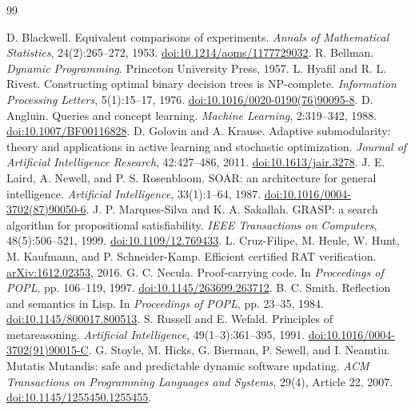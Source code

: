\begin{thebibliography}{99}
\small\raggedright
{} D. Blackwell. Equivalent comparisons of experiments. \emph{Annals of Mathematical Statistics}, 24(2):265--272, 1953. \href{https://doi.org/10.1214/aoms/1177729032}{doi:10.1214/aoms/1177729032}.
 R. Bellman. \emph{Dynamic Programming}. Princeton University Press, 1957.
 L. Hyafil and R. L. Rivest. Constructing optimal binary decision trees is NP-complete. \emph{Information Processing Letters}, 5(1):15--17, 1976. \href{https://doi.org/10.1016/0020-0190(76)90095-8}{doi:10.1016/0020-0190(76)90095-8}.
 D. Angluin. Queries and concept learning. \emph{Machine Learning}, 2:319--342, 1988. \href{https://doi.org/10.1007/BF00116828}{doi:10.1007/BF00116828}.
 D. Golovin and A. Krause. Adaptive submodularity: theory and applications in active learning and stochastic optimization. \emph{Journal of Artificial Intelligence Research}, 42:427--486, 2011. \href{https://doi.org/10.1613/jair.3278}{doi:10.1613/jair.3278}.
 J. E. Laird, A. Newell, and P. S. Rosenbloom. SOAR: an architecture for general intelligence. \emph{Artificial Intelligence}, 33(1):1--64, 1987. \href{https://doi.org/10.1016/0004-3702(87)90050-6}{doi:10.1016/0004-3702(87)90050-6}.
 J. P. Marques-Silva and K. A. Sakallah. GRASP: a search algorithm for propositional satisfiability. \emph{IEEE Transactions on Computers}, 48(5):506--521, 1999. \href{https://doi.org/10.1109/12.769433}{doi:10.1109/12.769433}.
 L. Cruz-Filipe, M. Heule, W. Hunt, M. Kaufmann, and P. Schneider-Kamp. Efficient certified RAT verification. \href{https://arxiv.org/abs/1612.02353}{\textnormal{arXiv:1612.02353}}, 2016.
 G. C. Necula. Proof-carrying code. In \emph{Proceedings of POPL}, pp. 106--119, 1997. \href{https://doi.org/10.1145/263699.263712}{doi:10.1145/263699.263712}.
 B. C. Smith. Reflection and semantics in Lisp. In \emph{Proceedings of POPL}, pp. 23--35, 1984. \href{https://doi.org/10.1145/800017.800513}{doi:10.1145/800017.800513}.
 S. Russell and E. Wefald. Principles of metareasoning. \emph{Artificial Intelligence}, 49(1--3):361--395, 1991. \href{https://doi.org/10.1016/0004-3702(91)90015-C}{doi:10.1016/0004-3702(91)90015-C}.
 G. Stoyle, M. Hicks, G. Bierman, P. Sewell, and I. Neamtiu. Mutatis Mutandis: safe and predictable dynamic software updating. \emph{ACM Transactions on Programming Languages and Systems}, 29(4), Article 22, 2007. \href{https://doi.org/10.1145/1255450.1255455}{doi:10.1145/1255450.1255455}.

\end{thebibliography}
